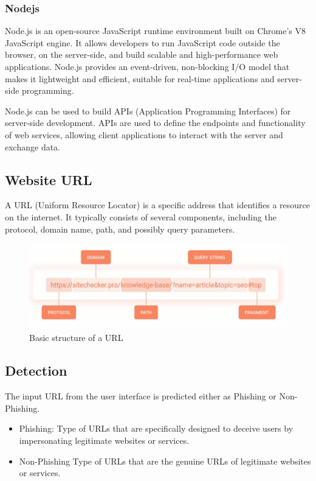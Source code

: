 \subsubsection{Nodejs}
\par Node.js is an open-source JavaScript runtime environment built on Chrome's V8 JavaScript engine. It allows developers to run JavaScript code outside the browser, on the server-side, and build scalable and high-performance web applications. Node.js provides an event-driven, non-blocking I/O model that makes it lightweight and efficient, suitable for real-time applications and server-side programming.
\par Node.js can be used to build APIs (Application Programming Interfaces) for server-side development. APIs are used to define the endpoints and functionality of web services, allowing client applications to interact with the server and exchange data.

\subsection{Website URL}
\par A URL (Uniform Resource Locator) is a specific address that identifies a resource on the internet. It typically consists of several components, including the protocol, domain name, path, and possibly query parameters.
\begin{figure}[H]
\centerline{\includegraphics[scale=0.6]{features.png}}
\caption{Basic structure of a URL}
\label{fig}
\end{figure}

\subsection{Detection}
\par The input URL from the user interface is predicted either as Phishing or Non-Phishing.
\begin{itemize}
    \item Phishing: Type of URLs that are specifically designed to deceive users by impersonating legitimate websites or services.
    \item Non-Phishing Type of URLs that are the genuine URLs of legitimate websites or services.
\end{itemize}

